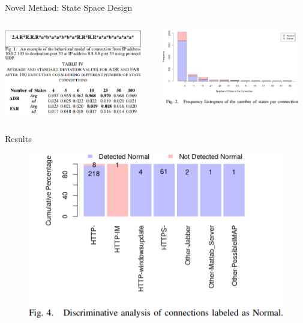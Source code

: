 \documentclass[pdf]{beamer}
\begin{document}
\begin{frame}[fragile]{Novel Method: State Space Design}
\begin{minipage}[0.2\textheight]{\textwidth}
\begin{columns}[T]
\begin{column}{0.5\textwidth}
\includegraphics[width=6cm]{Images/example.png}
\\
\vspace{1cm}
\includegraphics[width=6cm]{Images/conn_len.png}
\end{column}
\begin{column}{0.5\textwidth}
\vspace{.5cm}
\includegraphics[width=6cm]{Images/hist.png}
\end{column}
\end{columns}
\end{minipage}
\end{frame}



\begin{frame}[fragile]{Results}
\begin{figure}
\includegraphics[width=.8\linewidth,keepaspectratio]{Images/normal.png}
\end{figure}
\end{frame}
\end{document}
